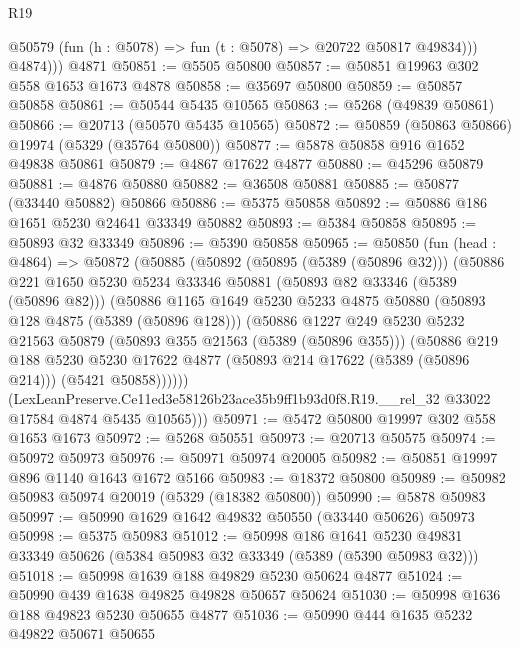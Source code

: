 \begin{lexlean}{R19}
\begin{coremodule}
            @50579
            (fun (h : @5078) => fun (t : @5078) => @20722 @50817 @49834)))
          @4874)))
    @4871
@50851 := @5505 @50800
@50857 := @50851 @19963 @302 @558 @1653 @1673 @4878
@50858 := @35697 @50800
@50859 := @50857 @50858
@50861 := @50544 @5435 @10565
@50863 := @5268 (@49839 @50861)
@50866 := @20713 (@50570 @5435 @10565)
@50872 := @50859 (@50863 @50866) @19974 (@5329 (@35764 @50800))
@50877 := @5878 @50858 @916 @1652 @49838 @50861
@50879 := @4867 @17622 @4877
@50880 := @45296 @50879
@50881 := @4876 @50880
@50882 := @36508 @50881
@50885 := @50877 (@33440 @50882) @50866
@50886 := @5375 @50858
@50892 := @50886 @186 @1651 @5230 @24641 @33349 @50882
@50893 := @5384 @50858
@50895 := @50893 @32 @33349
@50896 := @5390 @50858
@50965 := @50850
    (fun (head : @4864) =>
    @50872
      (@50885
        (@50892
          (@50895 (@5389 (@50896 @32)))
          (@50886
            @221
            @1650
            @5230
            @5234
            @33346
            @50881
            (@50893 @82 @33346 (@5389 (@50896 @82)))
            (@50886
              @1165
              @1649
              @5230
              @5233
              @4875
              @50880
              (@50893 @128 @4875 (@5389 (@50896 @128)))
              (@50886
                @1227
                @249
                @5230
                @5232
                @21563
                @50879
                (@50893 @355 @21563 (@5389 (@50896 @355)))
                (@50886
                  @219
                  @188
                  @5230
                  @5230
                  @17622
                  @4877
                  (@50893 @214 @17622 (@5389 (@50896 @214)))
                  (@5421 @50858))))))
        (LexLeanPreserve.Ce11ed3e58126b23ace35b9ff1b93d0f8.R19.__rel_32
          @33022
          @17584
          @4874
          @5435
          @10565)))
@50971 := @5472 @50800 @19997 @302 @558 @1653 @1673
@50972 := @5268 @50551
@50973 := @20713 @50575
@50974 := @50972 @50973
@50976 := @50971 @50974 @20005
@50982 := @50851 @19997 @896 @1140 @1643 @1672 @5166
@50983 := @18372 @50800
@50989 := @50982 @50983 @50974 @20019 (@5329 (@18382 @50800))
@50990 := @5878 @50983
@50997 := @50990 @1629 @1642 @49832 @50550 (@33440 @50626) @50973
@50998 := @5375 @50983
@51012 := @50998
    @186
    @1641
    @5230
    @49831
    @33349
    @50626
    (@5384 @50983 @32 @33349 (@5389 (@5390 @50983 @32)))
@51018 := @50998 @1639 @188 @49829 @5230 @50624 @4877
@51024 := @50990 @439 @1638 @49825 @49828 @50657 @50624
@51030 := @50998 @1636 @188 @49823 @5230 @50655 @4877
@51036 := @50990 @444 @1635 @5232 @49822 @50671 @50655

\end{coremodule}
\end{lexlean}

